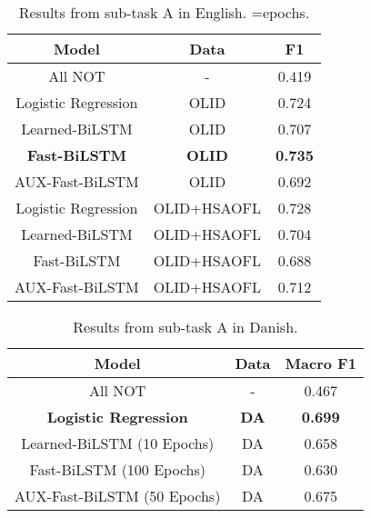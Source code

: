\documentclass{article}
\begin{document}
\begin{table}
\centering
\small
\caption{Results from sub-task A in English.  =epochs.}
\begin{tabular}{c|c|c}
\textbf{Model}              & \textbf{Data} & \textbf{F1} \\\hline
All NOT                     & -                  & 0.419             \\
Logistic Regression         & OLID\cite{zampieri2019predicting}               & 0.724             \\
Learned-BiLSTM     & OLID               & 0.707             \\
\textbf{Fast-BiLSTM }      & \textbf{OLID}               & \textbf{0.735}             \\
AUX-Fast-BiLSTM    & OLID               & 0.692             \\
Logistic Regression         & OLID+HSAOFL      & 0.728             \\
Learned-BiLSTM   & OLID+HSAOFL      & 0.704             \\
Fast-BiLSTM     & OLID+HSAOFL      & 0.688             \\
AUX-Fast-BiLSTM  & OLID+HSAOFL      & 0.712             \\
\end{tabular}
\label{table:subAEN}
\end{table}

\begin{table}
\centering
\small
\caption{Results from  sub-task A in Danish.}\label{table:subADA}
\begin{tabular}{c|c|c}
\textbf{Model}               & \textbf{Data} & \textbf{Macro F1} \\\hline
All NOT                      & -                  & 0.467             \\
\textbf{Logistic Regression} & \textbf{DA}        & \textbf{0.699}    \\
Learned-BiLSTM (10 Epochs)   & DA                 & 0.658             \\
Fast-BiLSTM (100 Epochs)     & DA                 & 0.630             \\
AUX-Fast-BiLSTM (50 Epochs)  & DA                 & 0.675             \\
\end{tabular}
\end{table}
\end{document}

